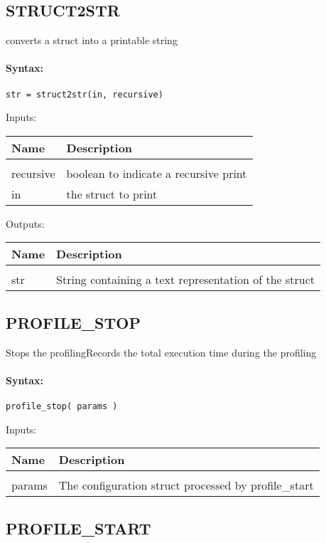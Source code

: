 \subsection{STRUCT2STR}

converts a struct into a printable string

\paragraph{Syntax:} \verb|str = struct2str(in, recursive)|

Inputs:

\begin{tabular}{|l|p{5cm}|}
\hline
\textbf{Name} & \textbf{Description} \\
\hline \hline \\
recursive & boolean to indicate a recursive print  \\ \hline
in & the struct to print  \\ \hline
\end{tabular}
Outputs:

\begin{tabular}{|l|p{5cm}|}
\hline
\textbf{Name} & \textbf{Description} \\
\hline \hline \\
str & String containing a text representation of the struct  \\ \hline
\end{tabular}

\subsection{PROFILE\_STOP}

Stops the profilingRecords the total execution time during the profiling

\paragraph{Syntax:} \verb|profile_stop( params )|

Inputs:

\begin{tabular}{|l|p{5cm}|}
\hline
\textbf{Name} & \textbf{Description} \\
\hline \hline \\
params & The configuration struct processed by profile\_start  \\ \hline
\end{tabular}

\subsection{PROFILE\_START}

